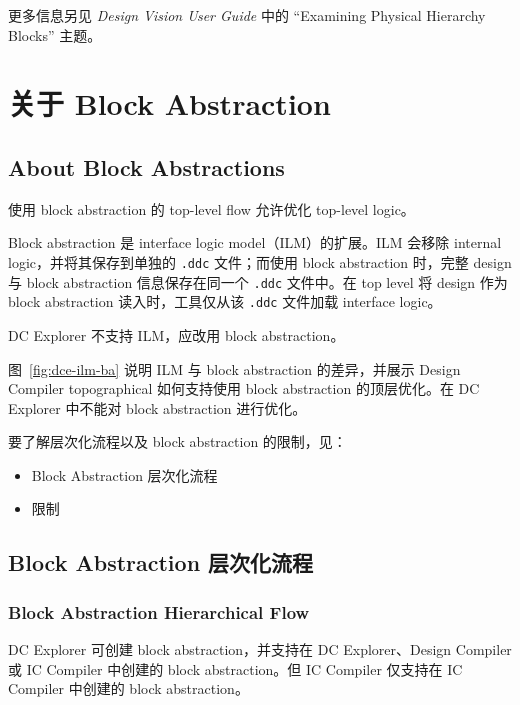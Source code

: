 更多信息另见 \textit{Design Vision User Guide} 中的 ``Examining Physical Hierarchy Blocks'' 主题。

\section{关于 Block Abstraction}
\subsection*{About Block Abstractions}

使用 block abstraction 的 top-level flow 允许优化 top-level logic。

Block abstraction 是 interface logic model（ILM）的扩展。ILM 会移除 internal logic，并将其保存到单独的 \texttt{.ddc} 文件；而使用 block abstraction 时，完整 design 与 block abstraction 信息保存在同一个 \texttt{.ddc} 文件中。在 top level 将 design 作为 block abstraction 读入时，工具仅从该 \texttt{.ddc} 文件加载 interface logic。

\begin{noteBox}
DC Explorer 不支持 ILM，应改用 block abstraction。
\end{noteBox}

图~\ref{fig:dce-ilm-ba} 说明 ILM 与 block abstraction 的差异，并展示 Design Compiler topographical 如何支持使用 block abstraction 的顶层优化。在 DC Explorer 中不能对 block abstraction 进行优化。


要了解层次化流程以及 block abstraction 的限制，见：
\begin{itemize}
  \item Block Abstraction 层次化流程
  \item 限制
\end{itemize}

\subsection{Block Abstraction 层次化流程}
\subsubsection*{Block Abstraction Hierarchical Flow}

DC Explorer 可创建 block abstraction，并支持在 DC Explorer、Design Compiler 或 IC Compiler 中创建的 block abstraction。但 IC Compiler 仅支持在 IC Compiler 中创建的 block abstraction。

